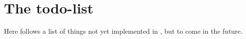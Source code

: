 \chapter*{The todo-list}

Here follows a list of things not yet implemented in \packagename, but to come 
in the future.